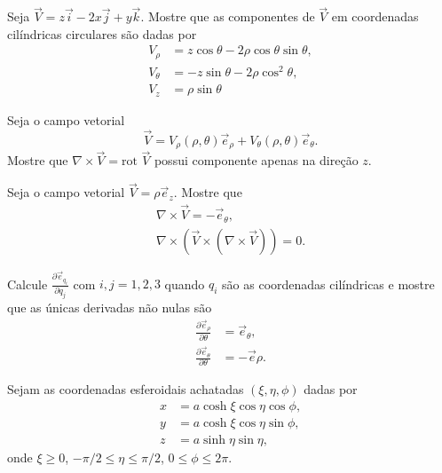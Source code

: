 \documentclass[a4paper,12pt,answers]{exam}
\newcommand{\devp}[2]{\frac{\partial #1}{\partial #2}}
\begin{document}
\thispagestyle{headandfoot}
\begin{questions}
  \question Seja $\vec{V} = z\vec{i} - 2x\vec{j} + y \vec{k}$. Mostre que as componentes de $\vec{V}$ em coordenadas cil\'{i}ndricas circulares s\~{a}o dadas por
  \begin{align*}
	V_\rho &= z \cos \theta - 2 \rho \cos \theta \sin \theta, \\
	V_\theta &= -z \sin \theta - 2 \rho \cos^2 \theta, \\
	V_z &= \rho \sin \theta
  \end{align*}
  \begin{solution}
	
  \end{solution}

  \question Seja o campo vetorial
  \[
  \vec{V} = V_\rho(\rho, \theta) \vec{e}_\rho + V_\theta(\rho, \theta) \vec{e}_\theta.
  \]
  Mostre que $\nabla \times \vec{V} = \mbox{rot } \vec{V}$ possui componente apenas na dire\c{c}\~{a}o $z$.
  \begin{solution}
	
  \end{solution}

  \question Seja o campo vetorial $\vec{V} = \rho \vec{e}_z$. Mostre que
  \begin{align*}
	\nabla \times \vec{V} = -\vec{e}_\theta, \\
	\nabla \times (\vec{V} \times (\nabla \times \vec{V})) = 0.
  \end{align*}
  \begin{solution}
	
  \end{solution}

  \question Calcule $\devp{\vec{e}_{q_i}}{q_j}$ com $i,j = 1, 2, 3$ quando $q_i$ s\~{a}o as coordenadas cil\'{i}ndricas e mostre que as únicas derivadas n\~{a}o nulas s\~{a}o
  \begin{align*}
	\devp{\vec{e}_\rho}{\theta} &= \vec{e}_\theta, \\
	\devp{\vec{e}_\theta}{\theta} &= - \vec{e}\rho.
  \end{align*}
  \begin{solution}
	
  \end{solution}

  \question Sejam as coordenadas esferoidais achatadas $(\xi, \eta, \phi)$ dadas por
  \begin{align*}
	x &= a \cosh \xi \cos \eta \cos \phi, \\
	y &= a \cosh \xi \cos \eta \sin \phi, \\
	z &= a \sinh \eta \sin \eta,
  \end{align*}
  onde $\xi \geq 0$, $-\pi/2 \leq \eta \leq \pi/2$, $0 \leq \phi \leq 2\pi$.
  

\end{questions}
\end{document}
